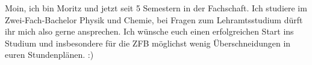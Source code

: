 \begin{multicols}{2}
{
Moin, ich bin Moritz und jetzt seit 5 Semestern in der Fachschaft. Ich studiere im Zwei-Fach-Bachelor Physik und Chemie, bei Fragen zum Lehramtsstudium dürft ihr mich also gerne ansprechen. 
Ich wünsche euch einen erfolgreichen Start ins Studium und insbesondere für die ZFB möglichst wenig Überschneidungen in euren Stundenplänen. :)
}


\end{multicols}

